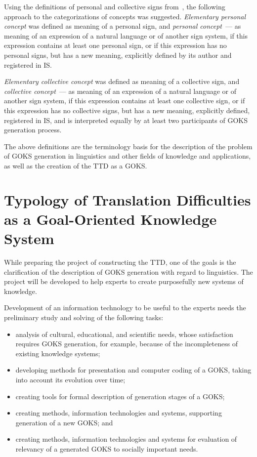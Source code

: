 \begin{multicols}{2}
   Using the definitions of personal and collective signs from~\cite{3bun, 1bun}, the following 
approach to the categorizations of concepts was suggested. \textit{Elementary personal concept} 
was defined as meaning of a personal sign, and \textit{personal concept}~--- as meaning of an 
expression of a natural language or of another sign system, if this expression contains at least one 
personal sign, or if this expression has no personal signs, but has a new meaning, explicitly 
defined by its author and registered in IS.
   
   \textit{Elementary collective concept} was defined as meaning of a collective sign, and 
\textit{collective concept}~--- as meaning of an expression of a natural language or of another 
sign system, if this expression contains at least one collective sign, or if this expression has no 
collective signs, but has a new meaning, explicitly defined, registered in IS, and is interpreted 
equally by at least two participants of GOKS generation process.
   
   The above definitions are the terminology basis for the description of the problem of GOKS 
generation in linguistics and other fields of knowledge and applications, as well as the creation 
of the TTD as a GOKS.

\section{Typology of Translation Difficulties as a Goal-Oriented Knowledge System}
   
\noindent
While preparing the project of constructing the TTD, one of the goals is the clarification of the 
description of GOKS generation with regard to linguistics. The project will be 
developed to help experts to create purposefully new 
systems of knowledge.
   
   Development of an information technology to be useful to the experts needs the preliminary study 
and solving of the following tasks:
   \begin{itemize}
\item analysis of cultural, educational, and scientific needs, 
whose satisfaction requires GOKS generation, for example, because of the 
incompleteness of existing knowledge systems;
\item developing methods for presentation and computer coding of a GOKS, taking 
into account its evolution over time;
\item creating tools for formal description of generation stages of a GOKS;
\item creating methods, information technologies and systems, supporting generation 
of a new GOKS; and
\item creating methods, information technologies and systems for evaluation of 
relevancy of a generated GOKS to socially important needs.
\end{itemize}


\end{multicols}
